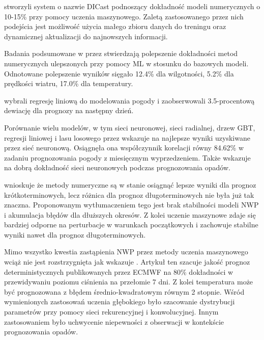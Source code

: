 \cite{machine-learning-for-applied-weather-prediction} stworzyli system 
o nazwie DICast podnoszący dokładność modeli numerycznych o 10-15\% przy pomocy
uczenia maszynowego. Zaletą zastosowanego przez nich podejścia jest możliwość
użycia małego zbioru danych do treningu oraz dynamicznej aktualizacji do 
najnowszych informacji.

Badania podsumowane w  przez  
\cite{ai-revolutionises-weather-prediction}
stwierdzają polepszenie dokładności metod numerycznych ulepszonych przy
pomocy ML w stosunku do bazowych modeli. Odnotowane polepszenie wyników
sięgało 12.4\% dla wilgotności, 5.2\% dla prędkości wiatru, 17.0\% dla
temperatury.

\cite{weather-monitoring-using-artificial-intelligence}
wybrali regresję liniową do modelowania pogody i zaobserwowali 3.5-procentową
dewiację dla prognozy na następny dzień.

Porównanie wielu modelów, w tym sieci neuronowej, sieci radialnej, 
drzew GBT, regresji liniowej i lasu losowego przez 
\cite{developing-machine-learning-algorithms} wskazuje na 
najlepsze wyniki uzyskiwane przez sieć neuronową. Osiągnęła ona 
współczynnik korelacji równy 84.62\% w zadaniu prognozowania
pogody z miesięcznym wyprzedzeniem. Także  
\cite{weather-forecasting-using-dl} wskazuje na dobrą dokładność
sieci neuronowych podczas prognozowania opadów.

\cite{ml-applied-to-weather-forecasting} wnioskuje że metody 
numeryczne są w stanie osiągnąć lepsze wyniki dla prognoz 
krótkoterminowych, lecz różnica dla prognoz długoterminowych
nie była już tak znaczna. Proponowanym wytłumaczeniem tego jest
brak stabilności modeli NWP i akumulacja błędów dla dłuższych 
okresów. Z kolei uczenie maszynowe zdaje się bardziej
odporne na perturbacje w warunkach początkowych i zachowuje 
stabilne wyniki nawet dla prognoz długoterminowych.

Mimo wszystko kwestia zastąpienia NWP przez metody uczenia maszynowego
wciąż nie jest rozstrzygnięta jak wskazuje 
\cite{can-dl-beat-numerical}. Artykuł ten szacuje jakość prognoz 
deterministycznych publikowanych przez ECMWF na 80\% dokładności w przewidywaniu
poziomu ciśnienia na przełomie 7 dni. Z kolei temperatura może być 
prognozowana z błędem średnio-kwadratowym równym 2 stopnie. Wśród wymienionych
zastosowań uczenia głębokiego było szacowanie dystrybucji parametrów przy pomocy 
sieci rekurencyjnej i konwolucyjnej. Innym zastosowaniem było uchwycenie
niepewności z obserwacji w kontekście prognozowania opadów.

